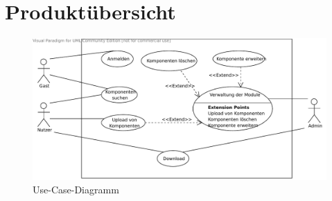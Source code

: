 \chapter{Produktübersicht}

\begin{figure}[h]
\centering
\includegraphics[width=0.8\linewidth]{bilder/Use-Case-Frontend.pdf}
\caption[Use-Case-Diagramm]{Use-Case-Diagramm}
\label{use-case}
\end{figure}
